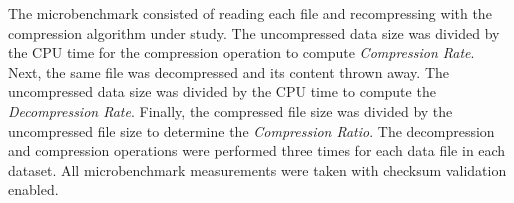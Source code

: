 The microbenchmark consisted of reading each \DataSeries{} file
and recompressing with the compression
algorithm under study.  The uncompressed data size was divided by the CPU time for the compression
operation  to compute {\em
Compression Rate}.  Next, the same file was decompressed and its
content thrown away.  The uncompressed data size was divided by the CPU time 
to compute the {\em Decompression Rate}.  
Finally, the compressed \DataSeries{} file size was
divided by the uncompressed \DataSeries{} file size to determine the {\em
Compression Ratio}.  The decompression and compression operations were
performed three times for each data file in each dataset.  All microbenchmark 
measurements were taken with checksum validation enabled.




